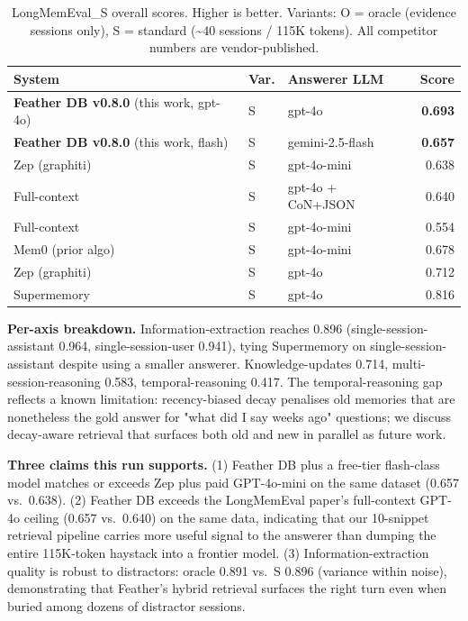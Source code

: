 \documentclass[11pt,twocolumn]{article}
\begin{document}
\begin{table}[h]
\centering
\caption{LongMemEval\_S overall scores. Higher is better. Variants: O = oracle
(evidence sessions only), S = standard (\textasciitilde{}40 sessions / 115K
tokens). All competitor numbers are vendor-published.}
\label{tab:longmemeval}
\small
\begin{tabular}{lllr}
\toprule
System & Var. & Answerer LLM & Score \\
\midrule
\textbf{Feather DB v0.8.0} (this work, gpt-4o) & S & gpt-4o & \textbf{0.693} \\
\textbf{Feather DB v0.8.0} (this work, flash) & S & gemini-2.5-flash & \textbf{0.657} \\
Zep (graphiti)~\cite{rasmussen2025zep} & S & gpt-4o-mini & 0.638 \\
Full-context~\cite{xu2024longmemeval} & S & gpt-4o + CoN+JSON & 0.640 \\
Full-context~\cite{xu2024longmemeval} & S & gpt-4o-mini & 0.554 \\
Mem0 (prior algo)~\cite{mem0blog} & S & gpt-4o-mini & 0.678 \\
Zep (graphiti)~\cite{rasmussen2025zep} & S & gpt-4o & 0.712 \\
Supermemory~\cite{supermemoryresearch} & S & gpt-4o & 0.816 \\
\bottomrule
\end{tabular}
\end{table}

\textbf{Per-axis breakdown.} Information-extraction reaches 0.896
(single-session-assistant 0.964, single-session-user 0.941), tying Supermemory
on single-session-assistant despite using a smaller answerer. Knowledge-updates
0.714, multi-session-reasoning 0.583, temporal-reasoning 0.417. The
temporal-reasoning gap reflects a known limitation: recency-biased decay
penalises old memories that are nonetheless the gold answer for "what did I
say weeks ago" questions; we discuss decay-aware retrieval that surfaces both
old and new in parallel as future work.

\textbf{Three claims this run supports.} (1) Feather DB plus a free-tier
flash-class model matches or exceeds Zep plus paid GPT-4o-mini on the same
dataset (0.657 vs.\ 0.638). (2) Feather DB exceeds the LongMemEval paper's
full-context GPT-4o ceiling (0.657 vs.\ 0.640) on the same data, indicating
that our 10-snippet retrieval pipeline carries more useful signal to the
answerer than dumping the entire 115K-token haystack into a frontier model.
(3) Information-extraction quality is robust to distractors: oracle 0.891 vs.\
S 0.896 (variance within noise), demonstrating that Feather's hybrid retrieval
surfaces the right turn even when buried among dozens of distractor sessions.
\end{document}
